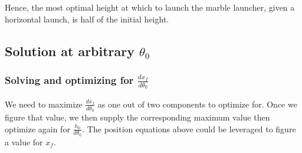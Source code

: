 \documentclass[11pt]{article}
\begin{document}
Hence, the most optimal height at which to launch the marble launcher, given a horizontal launch, is half of the initial height.

\subsection{Solution at arbitrary \(\theta_0\)}
\label{sec:org68615a8}

\subsubsection{Solving and optimizing for \(\frac{dx_f}{d\theta_0}\)}
\label{sec:org9cb76e5}
We need to maximize \(\frac{dx_f}{d\theta_0}\) as one out of two components to optimize for. Once we figure that value, we then supply the corresponding maximum value then optimize again for \(\frac{h_0}{d\theta_0}\). The position equations above could be leveraged to figure a value for \(x_f\). 
\end{document}
